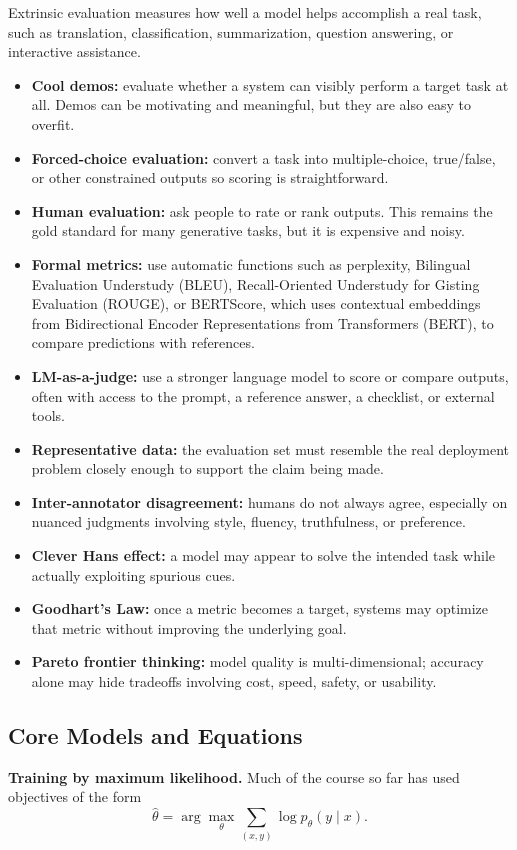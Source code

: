 \documentclass[11pt]{article}
\begin{document}
Extrinsic evaluation measures how well a model helps accomplish a real task, such as translation, classification, summarization, question answering, or interactive assistance.

\begin{itemize}
    \item \textbf{Cool demos:} evaluate whether a system can visibly perform a target task at all. Demos can be motivating and meaningful, but they are also easy to overfit.
    \item \textbf{Forced-choice evaluation:} convert a task into multiple-choice, true/false, or other constrained outputs so scoring is straightforward.
    \item \textbf{Human evaluation:} ask people to rate or rank outputs. This remains the gold standard for many generative tasks, but it is expensive and noisy.
    \item \textbf{Formal metrics:} use automatic functions such as perplexity, Bilingual Evaluation Understudy (BLEU), Recall-Oriented Understudy for Gisting Evaluation (ROUGE), or BERTScore, which uses contextual embeddings from Bidirectional Encoder Representations from Transformers (BERT), to compare predictions with references.
    \item \textbf{LM-as-a-judge:} use a stronger language model to score or compare outputs, often with access to the prompt, a reference answer, a checklist, or external tools.
    \item \textbf{Representative data:} the evaluation set must resemble the real deployment problem closely enough to support the claim being made.
    \item \textbf{Inter-annotator disagreement:} humans do not always agree, especially on nuanced judgments involving style, fluency, truthfulness, or preference.
    \item \textbf{Clever Hans effect:} a model may appear to solve the intended task while actually exploiting spurious cues.
    \item \textbf{Goodhart's Law:} once a metric becomes a target, systems may optimize that metric without improving the underlying goal.
    \item \textbf{Pareto frontier thinking:} model quality is multi-dimensional; accuracy alone may hide tradeoffs involving cost, speed, safety, or usability.
\end{itemize}

\subsection{Core Models and Equations}
\textbf{Training by maximum likelihood.} Much of the course so far has used objectives of the form
\[
\hat{\theta} = \arg\max_{\theta} \sum_{(x,y)} \log p_\theta(y \mid x).
\]
\end{document}
